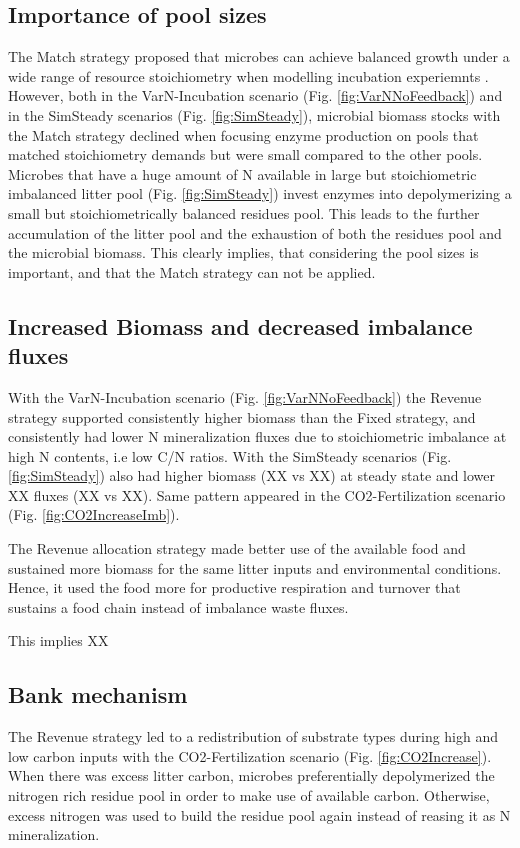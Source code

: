 \subsection{Importance of pool sizes}
The Match strategy proposed that microbes can achieve balanced growth under a
wide range of resource stoichiometry when modelling incubation experiemnts
.
However, both in the VarN-Incubation scenario (Fig.
\ref{fig:VarNNoFeedback}) and in the SimSteady scenarios (Fig.
\ref{fig:SimSteady}), microbial biomass stocks with the Match strategy declined
when focusing enzyme production on pools that matched stoichiometry demands but
were small compared to the other pools.
Microbes that have a huge amount of N available in large but stoichiometric
imbalanced litter pool (Fig. \ref{fig:SimSteady}) invest enzymes into
depolymerizing a small but stoichiometrically balanced residues pool. This leads
to the further accumulation of the litter pool and the exhaustion of both the
residues pool and the microbial biomass. This clearly implies, that considering
the pool sizes is important, and that the Match strategy can not be applied.

\subsection{Increased Biomass and decreased imbalance fluxes}
With the VarN-Incubation scenario (Fig.
\ref{fig:VarNNoFeedback}) the Revenue strategy supported consistently higher
biomass than the Fixed strategy, and consistently had lower N mineralization
fluxes due to stoichiometric imbalance at high N contents, i.e low C/N ratios.
With the SimSteady scenarios (Fig. \ref{fig:SimSteady}) also had higher biomass
(XX vs XX) at steady state and lower XX fluxes (XX vs XX). Same pattern appeared
in the CO2-Fertilization scenario (Fig. \ref{fig:CO2IncreaseImb}).

The Revenue allocation strategy made better use of the available
food and sustained more biomass for the same litter inputs and environmental
conditions. Hence, it used the food more for productive respiration and turnover
that sustains a food chain instead of imbalance waste fluxes.  

This implies XX

\subsection{Bank mechanism}
The Revenue strategy led to a redistribution of substrate types during high
and low carbon inputs with the  CO2-Fertilization scenario (Fig.
\ref{fig:CO2Increase}). When there was excess litter carbon, microbes
preferentially depolymerized the nitrogen rich residue pool in order to make use of available
carbon. Otherwise, excess nitrogen was used to build the residue pool again
instead of reasing it as N mineralization.
 
